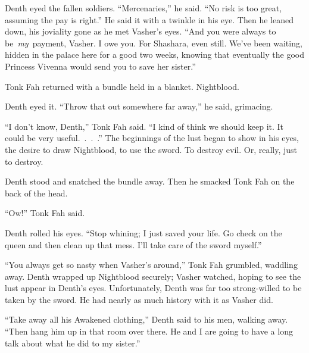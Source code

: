 Denth eyed the fallen soldiers. “Mercenaries,” he said. “No risk is too great, assuming the pay is right.” He said it with a twinkle in his eye. Then he leaned down, his joviality gone as he met Vasher’s eyes. “And you were always to be~\textit{my}~payment, Vasher. I owe you. For Shashara, even still. We’ve been waiting, hidden in the palace here for a good two weeks, knowing that eventually the good Princess Vivenna would send you to save her sister.”

Tonk Fah returned with a bundle held in a blanket. Nightblood.

Denth eyed it. “Throw that out somewhere far away,” he said, grimacing.

“I don’t know, Denth,” Tonk Fah said. “I kind of think we should keep it. It could be very useful.~.~.~.” The beginnings of the lust began to show in his eyes, the desire to draw Nightblood, to use the sword. To destroy evil. Or, really, just to destroy.

Denth stood and snatched the bundle away. Then he smacked Tonk Fah on the back of the head.

“Ow!” Tonk Fah said.

Denth rolled his eyes. “Stop whining; I just saved your life. Go check on the queen and then clean up that mess. I’ll take care of the sword myself.”

“You always get so nasty when Vasher’s around,” Tonk Fah grumbled, waddling away. Denth wrapped up Nightblood securely; Vasher watched, hoping to see the lust appear in Denth’s eyes. Unfortunately, Denth was far too strong-willed to be taken by the sword. He had nearly as much history with it as Vasher did.

“Take away all his Awakened clothing,” Denth said to his men, walking away. “Then hang him up in that room over there. He and I are going to have a long talk about what he did to my sister.”

